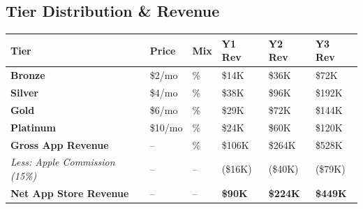 \documentclass[11pt,a4paper]{article}
\begin{document}
\vspace{0.3cm}

\begin{center}
\end{center}

\vspace{0.5cm}

\subsection*{\textcolor{milosecondary}{Tier Distribution \& Revenue}}

\begin{center}
\renewcommand{\arraystretch}{1.5}
\begin{tabular}{>{\raggedright\arraybackslash}p{2.8cm} >{\centering\arraybackslash}p{1.5cm} >{\centering\arraybackslash}p{1.8cm} >{\centering\arraybackslash}p{2.2cm} >{\centering\arraybackslash}p{2.2cm} >{\centering\arraybackslash}p{2.2cm}}
\toprule
\rowcolor{appstoreblue!15}
\textbf{Tier} & \textbf{Price} & \textbf{Mix} & \textbf{Y1 Rev} & \textbf{Y2 Rev} & \textbf{Y3 Rev} \\
\midrule
\rowcolor{bronzecolor!8}
\textcolor{bronzecolor}{\textbf{Bronze}} & \$2/mo & 30\% & \$14K & \$36K & \$72K \\
\rowcolor{silvercolor!8}
\textcolor{silvercolor}{\textbf{Silver}} & \$4/mo & 40\% & \$38K & \$96K & \$192K \\
\rowcolor{goldcolor!8}
\textcolor{goldcolor}{\textbf{Gold}} & \$6/mo & 20\% & \$29K & \$72K & \$144K \\
\rowcolor{platinumcolor!8}
\textcolor{platinumcolor}{\textbf{Platinum}} & \$10/mo & 10\% & \$24K & \$60K & \$120K \\
\midrule
\rowcolor{lightbg}
\textbf{Gross App Revenue} & -- & 100\% & \$106K & \$264K & \$528K \\
\rowcolor{dangerred!8}
\textit{Less: Apple Commission (15\%)} & -- & -- & (\$16K) & (\$40K) & (\$79K) \\
\rowcolor{successgreen!10}
\textbf{Net App Store Revenue} & -- & -- & \textbf{\$90K} & \textbf{\$224K} & \textbf{\$449K} \\
\bottomrule
\end{tabular}
\end{center}
\end{document}
